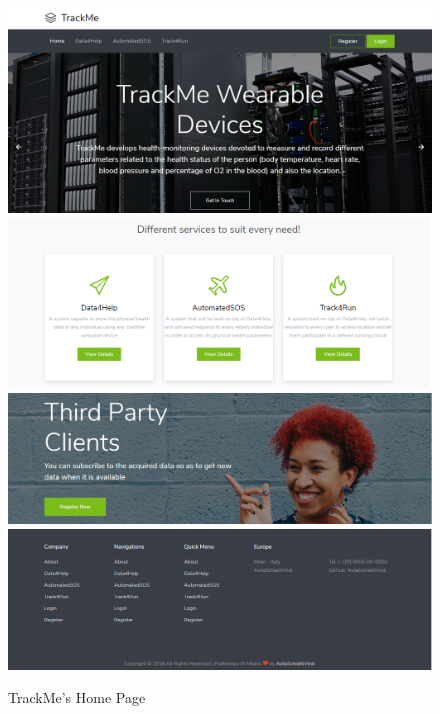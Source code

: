 \documentclass[a4paper, hidelinks, 12pt]{report}
\begin{document}
	\begin{figure}[H]
		\centering
		\includegraphics[scale=0.4]{UI/d4h_home1.png}
		\includegraphics[scale=0.4]{UI/d4h_home2.png}
		\includegraphics[scale=0.4]{UI/d4h_home3.png}
		\includegraphics[scale=0.4]{UI/d4h_home4.png}
		\caption[UI: TrackMe's Home Page]{TrackMe's Home Page}
		\label{fig:Home_Page}
	\end{figure}
	
\end{document}
